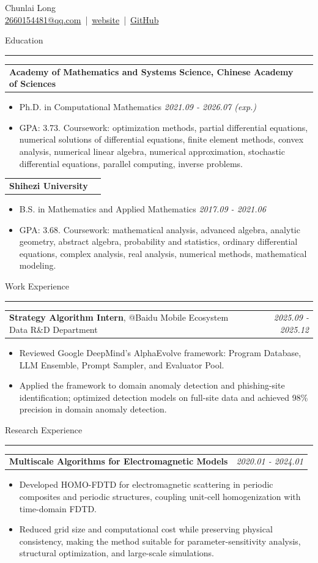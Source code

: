 \documentclass[10pt,a4paper]{article}
\makeatletter
\newcommand{\sectiontitle}[1]{%
  \vspace{0.55em}%
  {\Large #1}\par\vspace{-0.55em}%
  \noindent\rule{\textwidth}{0.4pt}\vspace{0.2em}%
}
\newcommand{\datedentry}[2]{%
  \noindent\begin{tabularx}{\textwidth}{@{}Xr@{}}
    #1 & {\itshape\color{muted} #2}
  \end{tabularx}\vspace{-0.35em}
}
\makeatother
\begin{document}
\begin{center}
  {\LARGE Chunlai Long}\\[0.22em]
  \href{mailto:2660154481@qq.com}{2660154481@qq.com}
  \,|\, \href{https://ysMiluz.github.io}{website}
  \,|\, \href{https://github.com/ysMiluz}{GitHub}
\end{center}
\vspace{-0.55em}

\sectiontitle{Education}
\datedentry{\textbf{Academy of Mathematics and Systems Science, Chinese Academy of Sciences}}{}
\begin{itemize}
  \item Ph.D. in Computational Mathematics \hfill {\itshape\color{muted} 2021.09 - 2026.07 (exp.)}
  \item GPA: 3.73. Coursework: optimization methods, partial differential equations, numerical solutions of differential equations, finite element methods, convex analysis, numerical linear algebra, numerical approximation, stochastic differential equations, parallel computing, inverse problems.
\end{itemize}
\datedentry{\textbf{Shihezi University}}{}
\begin{itemize}
  \item B.S. in Mathematics and Applied Mathematics \hfill {\itshape\color{muted} 2017.09 - 2021.06}
  \item GPA: 3.68. Coursework: mathematical analysis, advanced algebra, analytic geometry, abstract algebra, probability and statistics, ordinary differential equations, complex analysis, real analysis, numerical methods, mathematical modeling.
\end{itemize}

\sectiontitle{Work Experience}
\datedentry{\textbf{Strategy Algorithm Intern}, @Baidu Mobile Ecosystem Data R\&D Department}{2025.09 - 2025.12}
\begin{itemize}
  \item Reviewed Google DeepMind's AlphaEvolve framework: Program Database, LLM Ensemble, Prompt Sampler, and Evaluator Pool.
  \item Applied the framework to domain anomaly detection and phishing-site identification; optimized detection models on full-site data and achieved 98\% precision in domain anomaly detection.
\end{itemize}

\sectiontitle{Research Experience}
\datedentry{\textbf{Multiscale Algorithms for Electromagnetic Models}}{2020.01 - 2024.01}
\begin{itemize}
  \item Developed HOMO-FDTD for electromagnetic scattering in periodic composites and periodic structures, coupling unit-cell homogenization with time-domain FDTD.
  \item Reduced grid size and computational cost while preserving physical consistency, making the method suitable for parameter-sensitivity analysis, structural optimization, and large-scale simulations.
\end{itemize}
\end{document}
